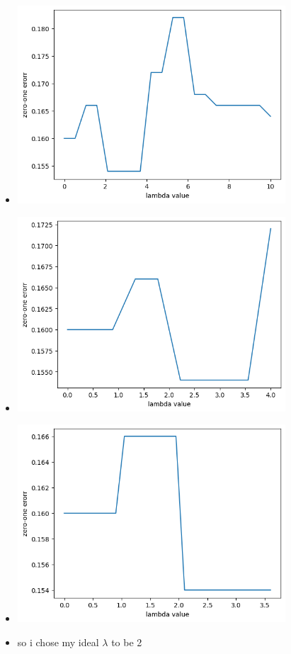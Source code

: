 \documentclass{article}
\theoremstyle{plain}
\theoremstyle{definition}
\begin{document}
\begin{enumerate}
\begin{itemize}
    \item \includegraphics[width=10cm]{homework/homework_3/immages/question_11_1.png}
        \item \includegraphics[width=10cm]{homework/homework_3/immages/question_11_2.png}
            \item \includegraphics[width=10cm]{homework/homework_3/immages/question_11_3.png}

                \item so i chose my ideal $\lambda$ to be 2
\end{itemize}

\setcounter{saveenum}{\value{enumi}}
\end{enumerate}
\end{document}

